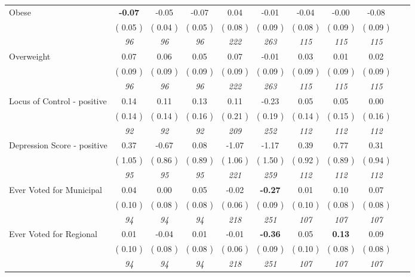 \begin{tabular}{l c c c c c c c c c c}
Obese & \textbf{     -0.07 } &     -0.05 &     -0.07 &      0.04 &     -0.01 &     -0.04 &     -0.00 &     -0.08 \\
& (     0.05 ) & (     0.04 ) & (     0.05 ) & (     0.08 ) & (     0.09 ) & (     0.08 ) & (     0.09 ) & (     0.09 ) \\
& \textit{ 96 } & \textit{ 96 } & \textit{ 96 } & \textit{ 222 } & \textit{ 263 } & \textit{ 115 } & \textit{ 115 } & \textit{ 115 } \\
Overweight &      0.07 &      0.06 &      0.05 &      0.07 &     -0.01 &      0.03 &      0.01 &      0.02 \\
& (     0.09 ) & (     0.09 ) & (     0.09 ) & (     0.09 ) & (     0.09 ) & (     0.09 ) & (     0.09 ) & (     0.09 ) \\
& \textit{ 96 } & \textit{ 96 } & \textit{ 96 } & \textit{ 222 } & \textit{ 263 } & \textit{ 115 } & \textit{ 115 } & \textit{ 115 } \\
Locus of Control - positive &      0.14 &      0.11 &      0.13 &      0.11 &     -0.23 &      0.05 &      0.05 &      0.00 \\
& (     0.14 ) & (     0.14 ) & (     0.16 ) & (     0.21 ) & (     0.19 ) & (     0.14 ) & (     0.15 ) & (     0.16 ) \\
& \textit{ 92 } & \textit{ 92 } & \textit{ 92 } & \textit{ 209 } & \textit{ 252 } & \textit{ 112 } & \textit{ 112 } & \textit{ 112 } \\
Depression Score - positive &      0.37 &     -0.67 &      0.08 &     -1.07 &     -1.17 &      0.39 &      0.77 &      0.31 \\
& (     1.05 ) & (     0.86 ) & (     0.89 ) & (     1.06 ) & (     1.50 ) & (     0.92 ) & (     0.89 ) & (     0.94 ) \\
& \textit{ 95 } & \textit{ 95 } & \textit{ 95 } & \textit{ 221 } & \textit{ 259 } & \textit{ 112 } & \textit{ 112 } & \textit{ 112 } \\
Ever Voted for Municipal &      0.04 &      0.00 &      0.05 &     -0.02 & \textbf{     -0.27 } &      0.01 &      0.10 &      0.07 \\
& (     0.10 ) & (     0.08 ) & (     0.08 ) & (     0.06 ) & (     0.09 ) & (     0.10 ) & (     0.08 ) & (     0.08 ) \\
& \textit{ 94 } & \textit{ 94 } & \textit{ 94 } & \textit{ 218 } & \textit{ 251 } & \textit{ 107 } & \textit{ 107 } & \textit{ 107 } \\
Ever Voted for Regional &      0.01 &     -0.04 &      0.01 &     -0.01 & \textbf{     -0.36 } &      0.05 & \textbf{      0.13 } &      0.09 \\
& (     0.10 ) & (     0.08 ) & (     0.08 ) & (     0.06 ) & (     0.09 ) & (     0.10 ) & (     0.08 ) & (     0.08 ) \\
& \textit{ 94 } & \textit{ 94 } & \textit{ 94 } & \textit{ 218 } & \textit{ 251 } & \textit{ 107 } & \textit{ 107 } & \textit{ 107 } \\
\bottomrule
\end{tabular}
